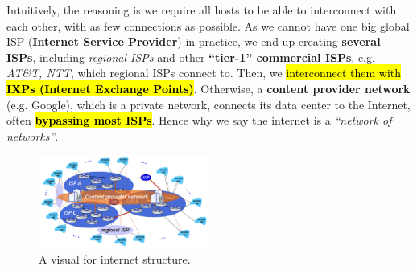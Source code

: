 \documentclass[12pt,a4paper]{article}
\begin{document}

\vspace{0.5em}

\noindent Intuitively, the reasoning is we require all hosts to be able to interconnect with each other, with as few connections as possible. As we cannot have one big global ISP (\textbf{Internet Service Provider}) in practice, we end up creating \textbf{several ISPs}, including \emph{regional ISPs} and other \textbf{``tier-1'' commercial ISPs}, e.g. \emph{AT\&T, NTT}, which regional ISPs connect to. Then, we \hl{interconnect them with \textbf{IXPs (Internet Exchange Points)}}. Otherwise, a \textbf{content provider network} (e.g. Google), which is a private network, connects its data center to the Internet, often \hl{\textbf{bypassing most ISPs}}. Hence why we say the internet is a \emph{``network of networks''}.

\begin{figure}[h]
    \centering
    \includegraphics[width=0.5\textwidth]{ch1_img/internet_structure.png}
    \caption{A visual for internet structure.}
    \label{fig:internet_structure}
\end{figure}
\end{document}
